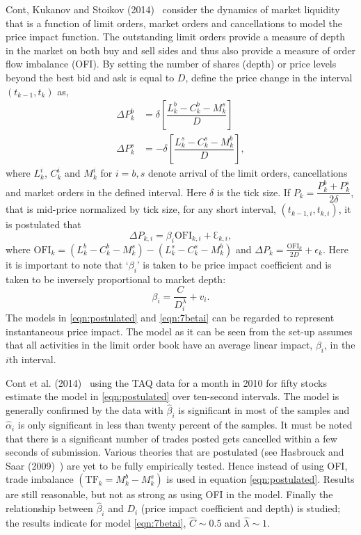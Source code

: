 Cont, Kukanov and Stoikov (2014)~\cite{contkulst} consider the dynamics of market liquidity that is a function of limit orders, market orders and cancellations to model the price impact function. The outstanding limit orders provide a measure of depth in the market on both buy and sell sides and thus also provide a measure of order flow imbalance (OFI). By setting the number of shares (depth) or price levels beyond the best bid and ask is equal to $D$, define the price change in the interval $(t_{k-1},t_k)$ as,
	\begin{equation}\label{eqn:doubleeq}
	\begin{aligned}
	\Delta P_k^b&= \delta \left[ \dfrac{L_k^b - C_k^b - M_k^s}{D} \right] \\
	\Delta P_k^s&= -\delta \left[\dfrac{L_k^s-C_k^s-M_k^b}{D}\right],
	\end{aligned}
	\end{equation}
where $L_k^i$, $C_k^i$ and $M_k^i$ for $i=b,s$ denote arrival of the limit orders, cancellations and market orders in the defined interval. Here $\delta$ is the tick size. If $P_k=\dfrac{P_k^b+P_k^s}{2\delta}$, that is mid-price normalized by tick size, for any short interval, $(t_{k-1,i},t_{k,i})$, it is postulated that
	\begin{equation}\label{eqn:postulated}
	\Delta P_{k,i} = \beta_i \text{OFI}_{k,i} + \Eulerconst_{k,i},
	\end{equation}
where $\text{OFI}_k=(L_k^b-C_k^b-M_k^s)-(L_k^s-C_k^s-M_k^b)$ and $\Delta P_k=\frac{\text{OFI}_k}{2D}+\epsilon_k$. Here it is important to note that `$\beta_i$' is taken to be price impact coefficient and is taken to be inversely proportional to market depth:
	\begin{equation} \label{eqn:7betai}
	\beta_i=\dfrac{C}{D_i^\lambda} + v_i.
	\end{equation}
The models in \eqref{eqn:postulated} and \eqref{eqn:7betai} can be regarded to represent instantaneous price impact. The model as it can be seen from the set-up assumes that all activities in the limit order book have an average linear impact, $\beta_i$, in the $i$th interval. 


Cont et al. (2014)~\cite{contkulst} using the TAQ data for a month in 2010 for fifty stocks estimate the model in \eqref{eqn:postulated} over ten-second intervals. The model is generally confirmed by the data with $\hat{\beta}_i$ is significant in most of the samples and $\hat{\alpha}_i$ is only significant in less than twenty percent of the samples. It must be noted that there is a significant number of trades posted gets cancelled within a few seconds of submission. Various theories that are postulated (see Hasbrouck and Saar (2009)~\cite{habbrooksaar}) are yet to be fully empirically tested. Hence instead of using OFI, trade imbalance $(\text{TF}_k=M_k^b-M_k^s)$ is used in equation \eqref{eqn:postulated}. Results are still reasonable, but not as strong as using OFI in the model. Finally the relationship between $\hat{\beta}_i$ and $D_i$ (price impact coefficient and depth) is studied; the results indicate for model \eqref{eqn:7betai}, $\hat{C} \sim 0.5$ and $\hat{\lambda} \sim 1$. 


